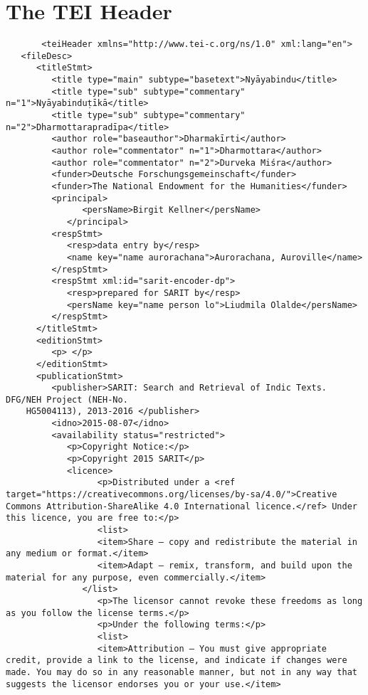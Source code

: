 \documentclass[article,12pt,a4paper]{memoir}
\begin{document}
	
	    
	    \endnumbering%
	    \endgroup
	    
     \backmatter 
	 \chapter{The TEI Header}
	 \begin{verbatim}
       <teiHeader xmlns="http://www.tei-c.org/ns/1.0" xml:lang="en">
   <fileDesc>
      <titleStmt>
         <title type="main" subtype="basetext">Nyāyabindu</title>
         <title type="sub" subtype="commentary" n="1">Nyāyabinduṭīkā</title>
         <title type="sub" subtype="commentary" n="2">Dharmottarapradīpa</title>
         <author role="baseauthor">Dharmakīrti</author>
         <author role="commentator" n="1">Dharmottara</author>
         <author role="commentator" n="2">Durveka Miśra</author>
         <funder>Deutsche Forschungsgemeinschaft</funder>
         <funder>The National Endowment for the Humanities</funder>
         <principal>
	           <persName>Birgit Kellner</persName>
	        </principal>
         <respStmt>
            <resp>data entry by</resp>
            <name key="name aurorachana">Aurorachana, Auroville</name>
         </respStmt>
         <respStmt xml:id="sarit-encoder-dp">
            <resp>prepared for SARIT by</resp>
            <persName key="name person lo">Liudmila Olalde</persName>
         </respStmt>
      </titleStmt>
      <editionStmt>
         <p> </p>
      </editionStmt>
      <publicationStmt>
         <publisher>SARIT: Search and Retrieval of Indic Texts. DFG/NEH Project (NEH-No.
	HG5004113), 2013-2016 </publisher>
         <idno>2015-08-07</idno>
         <availability status="restricted">
            <p>Copyright Notice:</p>
            <p>Copyright 2015 SARIT</p>
            <licence> 
	              <p>Distributed under a <ref target="https://creativecommons.org/licenses/by-sa/4.0/">Creative Commons Attribution-ShareAlike 4.0 International licence.</ref> Under this licence, you are free to:</p>
	              <list>
                  <item>Share — copy and redistribute the material in any medium or format.</item>
                  <item>Adapt — remix, transform, and build upon the material for any purpose, even commercially.</item>
               </list>
	              <p>The licensor cannot revoke these freedoms as long as you follow the license terms.</p>
	              <p>Under the following terms:</p>
	              <list>
                  <item>Attribution — You must give appropriate credit, provide a link to the license, and indicate if changes were made. You may do so in any reasonable manner, but not in any way that suggests the licensor endorses you or your use.</item>

\end{verbatim}
\end{document}
